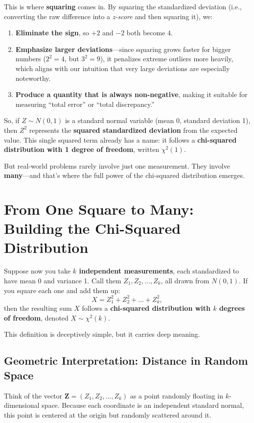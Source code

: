 \documentclass[12pt]{article}
\begin{document}
This is where \textbf{squaring} comes in. By squaring the standardized deviation (i.e., converting the raw difference into a \emph{z-score} and then squaring it), we:

\begin{enumerate}
    \item \textbf{Eliminate the sign}, so $+2$ and $-2$ both become $4$.
    \item \textbf{Emphasize larger deviations}—since squaring grows faster for bigger numbers ($2^2 = 4$, but $3^2 = 9$), it penalizes extreme outliers more heavily, which aligns with our intuition that very large deviations are especially noteworthy.
    \item \textbf{Produce a quantity that is always non-negative}, making it suitable for measuring ``total error'' or ``total discrepancy.''
\end{enumerate}

So, if $Z \sim N(0,1)$ is a standard normal variable (mean 0, standard deviation 1), then $Z^2$ represents the \textbf{squared standardized deviation} from the expected value. This single squared term already has a name: it follows a \textbf{chi-squared distribution with 1 degree of freedom}, written $\chi^2(1)$.

But real-world problems rarely involve just one measurement. They involve \textbf{many}—and that’s where the full power of the chi-squared distribution emerges.

\section*{From One Square to Many: Building the Chi-Squared Distribution}

Suppose now you take \textbf{$k$ independent measurements}, each standardized to have mean 0 and variance 1. Call them $Z_1, Z_2, \dots, Z_k$, all drawn from $N(0,1)$. If you square each one and add them up:
\[
X = Z_1^2 + Z_2^2 + \dots + Z_k^2,
\]
then the resulting sum $X$ follows a \textbf{chi-squared distribution with $k$ degrees of freedom}, denoted $X \sim \chi^2(k)$.

This definition is deceptively simple, but it carries deep meaning.

\subsection*{Geometric Interpretation: Distance in Random Space}

Think of the vector $\mathbf{Z} = (Z_1, Z_2, \dots, Z_k)$ as a point randomly floating in $k$-dimensional space. Because each coordinate is an independent standard normal, this point is centered at the origin but randomly scattered around it.
\end{document}
